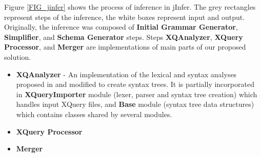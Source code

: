 Figure \ref{FIG_jinfer} shows the process of inference in jInfer. The grey rectangles represent steps of the inference, the white boxes represent input and output. Originally, the inference was composed of \textbf{Initial Grammar Generator}, \textbf{Simplifier}, and \textbf{Schema Generator} steps. Steps \textbf{XQAnalyzer}, \textbf{XQuery Processor}, and \textbf{Merger} are implementations of main parts of our proposed solution.

\begin{itemize}
\item \textbf{XQAnalyzer} - An implementation of the lexical and syntax analyses proposed in \cite{thesis_schejbal} and modified to create syntax trees. It is partially incorporated in \textbf{XQueryImporter} module (lexer, parser and syntax tree creation) which handles input XQuery files, and \textbf{Base} module (syntax tree data structures) which contains classes shared by several modules.
\item \textbf{XQuery Processor}
\item \textbf{Merger}
\end{itemize}